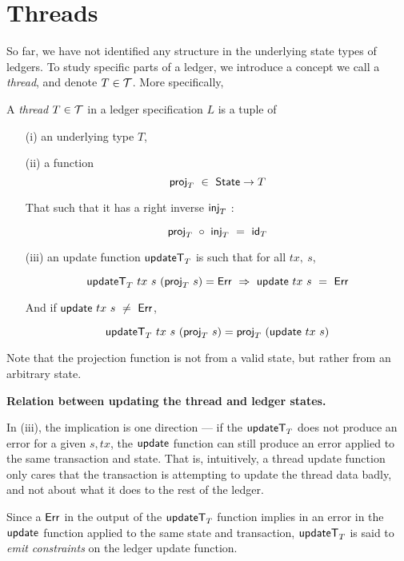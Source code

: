\section{Threads}
\label{sec:threads}

So far, we have not identified any structure in the underlying state types of
ledgers. To study specific parts of a ledger, we introduce a concept we call
a \emph{thread}, and denote $T \in \mathcal{T}$. More specifically,

\begin{definition}
  A \emph{thread} $T \in \mathcal{T}$ in a ledger specification $L$ is a tuple of
  \begin{itemize}
    \item[(i)] an underlying type $T$,

    \item[(ii)] a function
    \[ \mathsf{proj}_T ~\in~\mathsf{State} \to T \]

    That such that it has a right inverse $\mathsf{inj}_T$ :

    \[ \mathsf{proj}_T~\circ~\mathsf{inj}_T ~=~\mathsf{id}_T \]

    \item[(iii)] an update function $\mathsf{updateT}_T$ is such that
    for all $tx,~s$,

    \[ \mathsf{updateT}_T~tx~s~(\mathsf{proj}_T~s) = \mathsf{Err}~ \Rightarrow~ \mathsf{update}~tx~s~=~ \mathsf{Err} \]

    And if $\mathsf{update}~tx~s~\neq~ \mathsf{Err}$,

    \[ \mathsf{updateT}_T~tx~s~(\mathsf{proj}_T~s) = \mathsf{proj}_T~(\mathsf{update}~tx~s)\]
  \end{itemize}
\end{definition}

Note that the projection function is not from a valid state, but rather from an
arbitrary state.

\textbf{Relation between updating the thread and ledger states. }

In (iii), the implication is one direction --- if the $\mathsf{updateT}_T$
does not produce an error for a given $s, tx$, the $\mathsf{update}$ function can still produce an error applied
to the same transaction and state. That is, intuitively, a thread update function
only cares that the transaction is attempting to
update the thread data badly, and not about what it does to the rest of the ledger.

Since a $\mathsf{Err}$ in the output of the $\mathsf{updateT}_T$ function implies in an error
in the $\mathsf{update}$ function applied to the same state and transaction,
$\mathsf{updateT}_T$ is said to \emph{emit constraints} on the ledger update
function.

